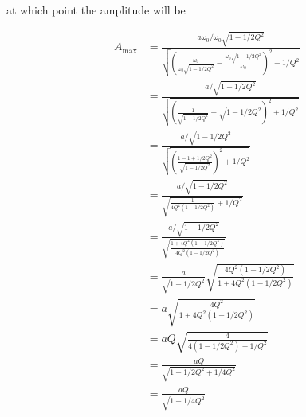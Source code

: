 \documentclass{article}
\begin{document}
at which point the amplitude will be

\begin{align*}
  A_\text{max} & = \frac{a \omega_0 / \omega_0 \sqrt{1 - 1 / 2 Q^2}}{\sqrt{\left( \frac{\omega_0}{\omega_0 \sqrt{1 - 1 / 2 Q^2}} - \frac{\omega_0 \sqrt{1 - 1 / 2 Q^2}}{\omega_0} \right)^2 + 1 / Q^2}} \\
               & = \frac{a / \sqrt{1 - 1 / 2 Q^2}}{\sqrt{\left( \frac{1}{\sqrt{1 - 1 / 2 Q^2}} - \sqrt{1 - 1 / 2 Q^2} \right)^2 + 1 / Q^2}}                                                             \\
               & = \frac{a / \sqrt{1 - 1 / 2 Q^2}}{\sqrt{\left( \frac{1 - 1 + 1 / 2 Q^2}{\sqrt{1 - 1 / 2 Q^2}} \right)^2 + 1 / Q^2}}                                                                    \\
               & = \frac{a / \sqrt{1 - 1 / 2 Q^2}}{\sqrt{\frac{1}{4 Q^4 (1 - 1 / 2 Q^2)} + 1 / Q^2}}                                                                                                    \\
               & = \frac{a / \sqrt{1 - 1 / 2 Q^2}}{\sqrt{\frac{1 + 4 Q^2 (1 - 1 / 2 Q^2)}{4 Q^2 (1 - 1 / 2 Q^2)}}}                                                                                      \\
               & = \frac{a}{\sqrt{1 - 1 / 2 Q^2}} \sqrt{\frac{4 Q^2 (1 - 1 / 2 Q^2)}{1 + 4 Q^2 (1 - 1 / 2 Q^2)}}                                                                                        \\
               & = a \sqrt{\frac{4 Q^2}{1 + 4 Q^2 (1 - 1 / 2 Q^2)}}                                                                                                                                     \\
               & = a Q \sqrt{\frac{4}{4 (1 - 1 / 2 Q^2) + 1 / Q^2}}                                                                                                                                     \\
               & = \frac{a Q}{\sqrt{1 - 1 / 2 Q^2 + 1 / 4 Q^2}}                                                                                                                                         \\
               & = \frac{a Q}{\sqrt{1 - 1 / 4 Q^2}}
\end{align*}

\subsection{}
\end{document}
